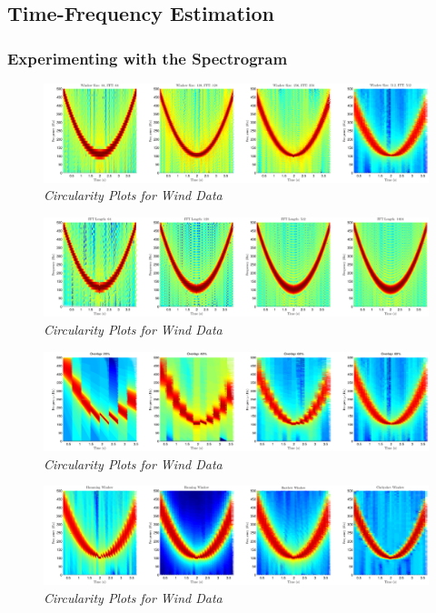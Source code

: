 \documentclass[./main.tex]{subfiles}
\begin{document}
\subsection{Time-Frequency Estimation}

\subsubsection{Experimenting with the Spectrogram}


\begin{figure}[h]
	\centering 
	\includegraphics[scale=0.45]{fig/2/2_3_a_window_size.pdf}
	\caption{\textit{Circularity Plots for Wind Data}}
	\label{fig:}
\end{figure}

\begin{figure}[h]
	\centering 
	\includegraphics[scale=0.45]{fig/2/2_3_a_fft_len.pdf}
	\caption{\textit{Circularity Plots for Wind Data}}
	\label{fig:}
\end{figure}

\begin{figure}[h]
	\centering 
	\includegraphics[scale=0.45]{fig/2/2_3_a_overlap.pdf}
	\caption{\textit{Circularity Plots for Wind Data}}
	\label{fig:}
\end{figure}

\begin{figure}[h]
	\centering 
	\includegraphics[scale=0.45]{fig/2/2_3_a_windows.pdf}
	\caption{\textit{Circularity Plots for Wind Data}}
	\label{fig:}
\end{figure}
\end{document}
